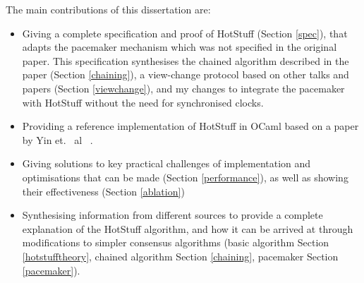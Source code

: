 The main contributions of this dissertation are:
\begin{itemize}
	\item Giving a complete specification and proof of HotStuff (Section \ref{spec}), that adapts the pacemaker mechanism which was not specified in the original paper. This specification synthesises the chained algorithm described in the paper (Section \ref{chaining}), a view-change protocol based on other talks and papers (Section \ref{viewchange}), and my changes to integrate the pacemaker with HotStuff without the need for synchronised clocks.
	\item Providing a reference implementation of HotStuff in OCaml based on a paper by Yin et. ~al~ \cite{yinHotStuffBFTConsensus2019}.
	\item Giving solutions to key practical challenges of implementation and optimisations that can be made (Section \ref{performance}), as well as showing their effectiveness (Section \ref{ablation})
	\item Synthesising information from different sources to provide a complete explanation of the HotStuff algorithm, and how it can be arrived at through modifications to simpler consensus algorithms (basic algorithm Section \ref{hotstufftheory}, chained algorithm Section \ref{chaining}, pacemaker Section \ref{pacemaker}).
\end{itemize}
